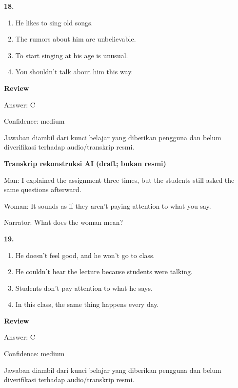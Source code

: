 \documentclass[12pt]{article}
\begin{document}
\noindent\textbf{18.}
\begin{enumerate}[label=(\Alph*),leftmargin=*,itemsep=0.2em]
\item He likes to sing old songs.
\item The rumors about him are unbelievable.
\item To start singing at his age is unusual.
\item You shouldn't talk about him this way.
\end{enumerate}
\par
\begingroup
\setlength{\parskip}{0pt}
\setlength{\parindent}{0pt}
\textbf{Review}\par
Answer: C\par
Confidence: medium\par
Jawaban diambil dari kunci belajar yang diberikan pengguna dan belum diverifikasi terhadap audio/transkrip resmi.\par
\endgroup
\par
\vspace{0.25\baselineskip}
\begin{exampleblock}
\textbf{Transkrip rekonstruksi AI (draft; bukan resmi)}\par
Man: I explained the assignment three times, but the students still asked the same questions afterward.\par
Woman: It sounds as if they aren't paying attention to what you say.\par
Narrator: What does the woman mean?\par
\end{exampleblock}
\noindent\textbf{19.}
\begin{enumerate}[label=(\Alph*),leftmargin=*,itemsep=0.2em]
\item He doesn't feel good, and he won't go to class.
\item He couldn't hear the lecture because students were talking.
\item Students don't pay attention to what he says.
\item In this class, the same thing happens every day.
\end{enumerate}
\par
\begingroup
\setlength{\parskip}{0pt}
\setlength{\parindent}{0pt}
\textbf{Review}\par
Answer: C\par
Confidence: medium\par
Jawaban diambil dari kunci belajar yang diberikan pengguna dan belum diverifikasi terhadap audio/transkrip resmi.\par
\end{document}
